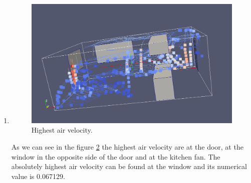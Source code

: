 \documentclass[a4paper]{article}
\begin{document}
\begin{enumerate}
\begin{figure}[H]
            \caption{Highest air pressure.}
            \label{fig:pressure}
        \end{figure}
        The highest air pressure can be found in the figure \ref{fig:pressure}. The red dot
        in the image indicate where the air pressure is the highest. Generally
        the air pressure increases the closer to the ground we get. The highest
        air pressure value is 0.186993.
    \item
        \begin{figure}[H]
            \includegraphics[width=1\linewidth]{lab5/kitchen-largest-air-velocity-screenshot.png}
            \caption{Highest air velocity.}
            \label{fig:velocity}
        \end{figure}
        As we can see in the figure \ref{fig:velocity} the highest air velocity are at the
        door, at the window in the opposite side of the door and at the kitchen
        fan. The absolutely highest air velocity can be found at the window and
        its numerical value is 0.067129.
\end{enumerate}
\end{document}
